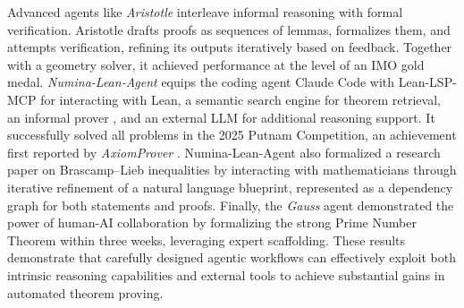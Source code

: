 \documentclass[11pt]{article}
\numberwithin{equation}{section}
\begin{document}
Advanced agents like \textit{Aristotle} \cite{achim2025aristotle} interleave informal reasoning with formal verification. Aristotle drafts proofs as sequences of lemmas, formalizes them, and attempts verification, refining its outputs iteratively based on feedback. Together with a geometry solver, it achieved performance at the level of an IMO gold medal. \textit{Numina-Lean-Agent} \cite{liu2026numina} equips the coding agent Claude Code with Lean-LSP-MCP \cite{lean-lsp-mcp} for interacting with Lean, a semantic search engine for theorem retrieval, an informal prover \cite{huang2025winning}, and an external LLM for additional reasoning support. It successfully solved all problems in the 2025 Putnam Competition, an achievement first reported by \textit{AxiomProver} \cite{axiommath_fromSeeingWhy_2025}. Numina-Lean-Agent also formalized a research paper on Brascamp–Lieb inequalities \cite{benard2025effective} by interacting with mathematicians through iterative refinement of a natural language blueprint, represented as a dependency graph for both statements and proofs.
Finally, the \textit{Gauss} agent \cite{mathinc_gauss} demonstrated the power of human-AI collaboration by formalizing the strong Prime Number Theorem within three weeks, leveraging expert scaffolding. These results demonstrate that carefully designed agentic workflows can effectively exploit both intrinsic reasoning capabilities and external tools to achieve substantial gains in automated theorem proving.

\end{document}
